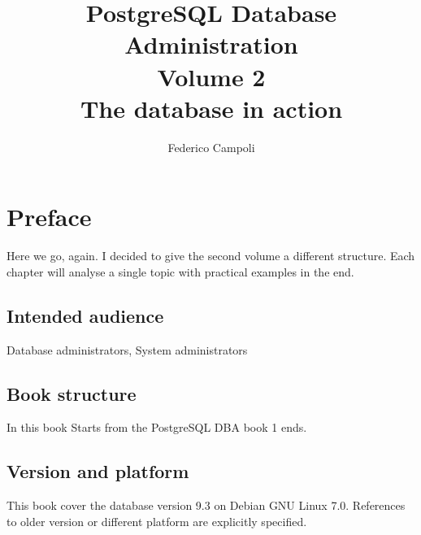 \documentclass[oneside]{book}
\author{Federico Campoli}
\title{PostgreSQL Database Administration \\ Volume 2 \\ The database in action}
\begin{document}
\maketitle

\newpage{}



\tableofcontents{}

\chapter*{Preface}
Here we go, again. I decided to give the second volume a different structure. Each chapter will 
analyse a single topic with practical examples in the end. 





\section*{Intended audience}
Database administrators, System administrators

\section*{Book structure}
In this book Starts from the PostgreSQL DBA book 1 ends.\newlinechar


\section*{Version and platform}
This book cover the database version 9.3 on Debian GNU Linux 7.0.
References to older version or different platform are explicitly specified.




\appendix

\listoffigures
\listoftables
\printindex{}
\end{document}
